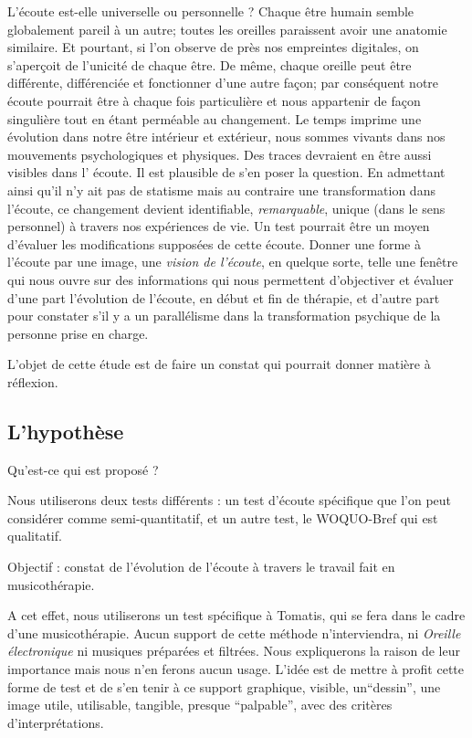 L'écoute est-elle universelle ou personnelle ?
 Chaque être humain semble  globalement pareil à un autre; toutes les oreilles 
paraissent  avoir une anatomie similaire. Et pourtant, si l'on observe de près 
nos empreintes digitales, on s'aperçoit de l'unicité de chaque être. De même, 
chaque oreille peut être différente, différenciée et  fonctionner d'une autre 
façon;  par conséquent notre  écoute pourrait être à chaque fois particulière 
et nous appartenir de façon singulière tout en étant perméable au changement.
Le temps imprime une évolution dans notre être intérieur et extérieur, nous 
sommes vivants dans nos mouvements psychologiques et physiques. Des traces 
devraient en être aussi visibles dans l' écoute. Il est plausible de s'en poser 
la question.
En admettant ainsi qu'il n'y ait pas de statisme mais au contraire une 
transformation dans l'écoute, ce changement devient identifiable, 
\textit{remarquable}, unique (dans le sens personnel) à travers nos expériences 
de vie.  Un test pourrait être un moyen d'évaluer les modifications supposées 
de cette écoute. 
Donner une forme à l'écoute par une image, une \emph{vision de l'écoute}, en 
quelque sorte, telle une fenêtre qui nous ouvre sur des informations qui nous 
permettent d'objectiver et évaluer d'une part 
 l'évolution de l'écoute, en début et fin de thérapie, et d'autre part pour 
constater s'il y a un parallélisme dans la transformation psychique  de la 
personne prise en charge.

L'objet de cette étude est de faire un constat
qui pourrait donner matière à réflexion.


\subsection{L'hypothèse}

Qu'est-ce qui est proposé ? 
	
	Nous utiliserons deux tests différents : 
	un test d'écoute spécifique que l'on peut considérer comme 
semi-quantitatif, 
	et un autre test, le WOQUO-Bref qui est qualitatif.
	
Objectif : constat de l'évolution de l'écoute à travers le travail fait en 
musicothérapie.

A cet effet, nous utiliserons un test spécifique à Tomatis, qui se fera dans le 
cadre d'une musicothérapie. Aucun support de cette méthode n'interviendra, ni 
\textsl{Oreille
	électronique} ni musiques préparées et filtrées. Nous expliquerons la 
raison de   leur importance mais nous n'en ferons aucun usage. L'idée est de 
mettre à profit cette forme de test et de  s'en tenir à ce support
graphique, visible, un``dessin'', une image utile, utilisable, tangible,
presque ``palpable'', avec des critères
d'interprétations.
	



